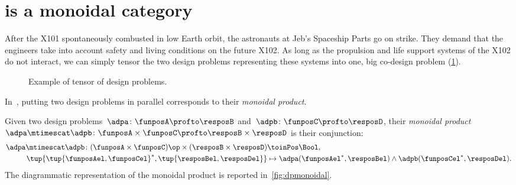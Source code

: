 

\section{\DP is a monoidal category}\label{sec:parallelism-DP-monoidal}


\begin{example}
    After the X101 spontaneously combusted in low Earth orbit, the astronauts at Jeb's Spaceship Parts go on strike.
    They demand that the engineers take into account safety and living conditions on the future X102. As long as the propulsion and life support systems of the X102 do not interact, we can simply tensor the two design problems representing these systems into one, big co-design problem (\cref{fig:examplemonoidal}).
    \begin{figure}[h!]
        \begin{center}
        \end{center}
        \caption{Example of tensor of design problems. \label{fig:examplemonoidal}}
    \end{figure}
\end{example}
In~\DP, putting two design problems in parallel corresponds to their \emph{monoidal product}.

\begin{definition}
    \label{def:monoidalproduct}
    Given two design problems~$\adpa \colon \funposA \profto \resposB$ and~$\adpb \colon \funposC \profto \resposD$, their \emph{monoidal product}~$\adpa \mtimescat \adpb \colon \funposA \times \funposC \profto \resposB\times \resposD$ is their conjunction:
    \begin{equation}
        \label{eq:monoidalprod_dp}
        \begin{aligned}
            \adpa \mtimescat \adpb \colon (\funposA \times \funposC)\op \times (\resposB \times \resposD) & \toinPos \Bool, \\
            \tup{\tup{\funposAel,\funposCel}^*,\tup{\resposBel,\resposDel}} &\mapsto \adpa(\funposAel^*,\resposBel) \wedge \adpb(\funposCel^*,\resposDel).
        \end{aligned}
    \end{equation}
    The diagrammatic representation of the monoidal product is reported in~\cref{fig:dpmonoidal}.
\end{definition}

